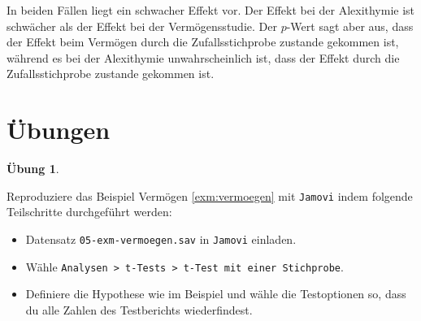 \documentclass[
]{book}
\providecommand{\tightlist}{%
  \setlength{\itemsep}{0pt}\setlength{\parskip}{0pt}}
\theoremstyle{definition}
\theoremstyle{definition}
\theoremstyle{definition}
\newtheorem{exercise}{Übung}[chapter]
\theoremstyle{definition}
\theoremstyle{remark}
\begin{document}
In beiden Fällen liegt ein schwacher Effekt vor. Der Effekt bei der Alexithymie ist schwächer als der Effekt bei der Vermögensstudie. Der \(p\)-Wert sagt aber aus, dass der Effekt beim Vermögen durch die Zufallsstichprobe zustande gekommen ist, während es bei der Alexithymie unwahrscheinlich ist, dass der Effekt durch die Zufallsstichprobe zustande gekommen ist.

\section{Übungen}\label{uxfcbungen-2}

\begin{exercise}
\protect\hypertarget{exr:vermoegen}{}\label{exr:vermoegen}\leavevmode

Reproduziere das Beispiel Vermögen \ref{exm:vermoegen} mit \texttt{Jamovi} indem folgende Teilschritte durchgeführt werden:

\begin{itemize}
\tightlist
\item
  Datensatz \texttt{05-exm-vermoegen.sav} in \texttt{Jamovi} einladen.
\item
  Wähle \texttt{Analysen\ \textgreater{}\ t-Tests\ \textgreater{}\ t-Test\ mit\ einer\ Stichprobe}.
\item
  Definiere die Hypothese wie im Beispiel und wähle die Testoptionen so, dass du alle Zahlen des Testberichts wiederfindest.
\end{itemize}

\end{exercise}
\end{document}
